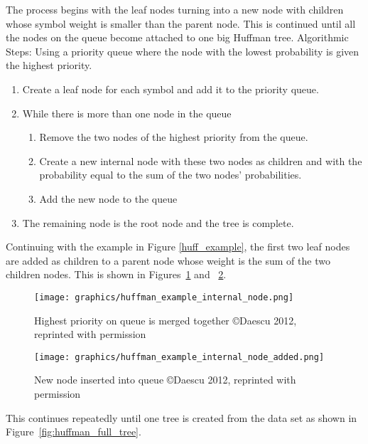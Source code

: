 \documentclass[letterpaper, 11pt]{article}
\begin{document}
The process begins with the leaf nodes turning into a new node with children whose symbol weight is smaller than
the parent node. This is continued until all the nodes on the queue become attached to one big Huffman tree.
Algorithmic Steps:
Using a priority queue where the node with the lowest probability is given the highest priority.
\begin{enumerate}
 \item Create a leaf node for each symbol and add it to the priority queue.
 \item While there is more than one node in the queue
 \begin{enumerate}
    \item Remove the two nodes of the highest priority from the queue.
    \item Create a new internal node with these two nodes as children and with the probability equal to
	  the sum of the two nodes' probabilities.
    \item Add the new node to the queue
  \end{enumerate}
  \item The remaining node is the root node and the tree is complete.
\end{enumerate}

Continuing with the example in Figure \ref{huff_example}, the first two leaf nodes are added as children to a parent node whose
weight is the sum of the two children nodes. This is shown in Figures~\ref{fig:huffman_ex_int_1} and
~\ref{fig:huffman_ex_int_2}.
\par\vspace{\baselineskip}

\begin{figure}
  \centering
  \texttt{[image: graphics/huffman\_example\_internal\_node.png]}
  \cite{huffman}
  \caption{Highest priority on queue is merged together  \copyright Daescu 2012, reprinted with permission}
  \label{fig:huffman_ex_int_1}
\end{figure}

\begin{figure}
  \centering
  \texttt{[image: graphics/huffman\_example\_internal\_node\_added.png]}
  \cite{huffman}
  \caption{New node inserted into queue  \copyright Daescu 2012, reprinted with permission}
  \label{fig:huffman_ex_int_2}
\end{figure}

This continues repeatedly until one tree is created from the data set as shown in Figure~\ref{fig:huffman_full_tree}.
\par\vspace{\baselineskip}
\end{document}
